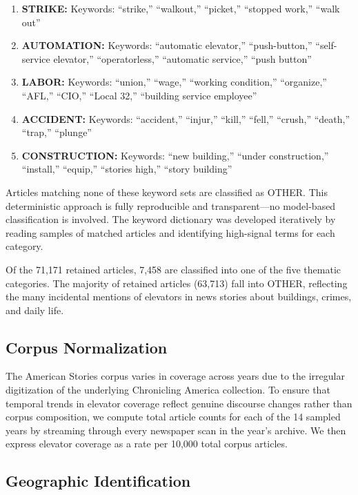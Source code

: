 \documentclass[12pt]{article}
\begin{document}
\begin{enumerate}
  \item \textbf{STRIKE:} Keywords: ``strike,'' ``walkout,'' ``picket,'' ``stopped work,'' ``walk out''
  \item \textbf{AUTOMATION:} Keywords: ``automatic elevator,'' ``push-button,'' ``self-service elevator,'' ``operatorless,'' ``automatic service,'' ``push button''
  \item \textbf{LABOR:} Keywords: ``union,'' ``wage,'' ``working condition,'' ``organize,'' ``AFL,'' ``CIO,'' ``Local 32,'' ``building service employee''
  \item \textbf{ACCIDENT:} Keywords: ``accident,'' ``injur,'' ``kill,'' ``fell,'' ``crush,'' ``death,'' ``trap,'' ``plunge''
  \item \textbf{CONSTRUCTION:} Keywords: ``new building,'' ``under construction,'' ``install,'' ``equip,'' ``stories high,'' ``story building''
\end{enumerate}

Articles matching none of these keyword sets are classified as OTHER. This deterministic approach is fully reproducible and transparent---no model-based classification is involved. The keyword dictionary was developed iteratively by reading samples of matched articles and identifying high-signal terms for each category.

Of the 71,171 retained articles, 7,458 are classified into one of the five thematic categories. The majority of retained articles (63,713) fall into OTHER, reflecting the many incidental mentions of elevators in news stories about buildings, crimes, and daily life.

\subsection{Corpus Normalization}

The American Stories corpus varies in coverage across years due to the irregular digitization of the underlying Chronicling America collection. To ensure that temporal trends in elevator coverage reflect genuine discourse changes rather than corpus composition, we compute total article counts for each of the 14 sampled years by streaming through every newspaper scan in the year's archive. We then express elevator coverage as a rate per 10,000 total corpus articles.

\subsection{Geographic Identification}
\end{document}

